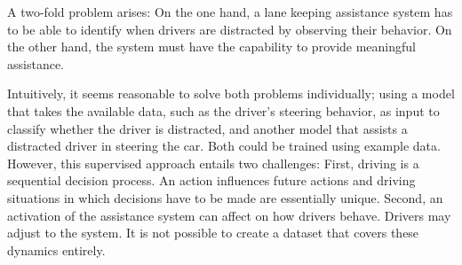 

A two-fold problem arises: On the one hand, a lane keeping assistance system has to be able to identify when drivers are distracted by observing their behavior. On the other hand, the system must have the capability to provide meaningful assistance. 



Intuitively, it seems reasonable to solve both problems individually; using a model that takes the available data, such as the driver's steering behavior, as input to classify whether the driver is distracted, and another model that assists a distracted driver in steering the car. Both could be trained using example data. However, this supervised approach entails two challenges: First, driving is a sequential decision process. An action influences future actions and driving situations in which decisions have to be made are essentially unique. Second, an activation of the assistance system can affect on how drivers behave. Drivers may adjust to the system. It is not possible to create a dataset that covers these dynamics entirely.





